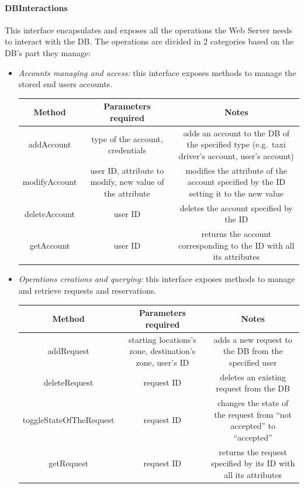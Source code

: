 \documentclass{article}
\begin{document}
\paragraph{DBInteractions}
This interface encapsulates and exposes all the operations the Web Server needs to interact with the DB\@. The operations are divided in 2 categories based on the DB's part they manage:
\begin{itemize}	
	\item \textit{Accounts managing and access:} this interface exposes methods to manage the stored end users accounts.	
	
		\begin{tabular}{*{3}{c}}
			\toprule
			Method & Parameters required & Notes \\
			\midrule
			addAccount & type of the account, credentials & adds an account to the DB of the specified type (e.g.\ taxi driver's account, user's account) \\
			modifyAccount & user ID, attribute to modify, new value of the attribute & modifies the attribute of the account specified by the ID setting it to the new value\\ 
			deleteAccount & user ID & deletes the account specified by the ID \\
			getAccount & user ID & returns the account corresponding to the ID with all its attributes \\
			\bottomrule
		\end{tabular}	
	\item \textit{Operations creations and querying:} this interface exposes methods to manage and retrieve requests and reservations.	
		\begin{tabular}{*{3}{c}}
			\toprule
			Method & Parameters required & Notes \\
			\midrule
			addRequest & starting locations's zone, destination's zone, user's ID & adds a new request to the DB from the specified user\\ %
			deleteRequest & request ID & deletes an existing request from the DB\\ 
			toggleStateOfTheRequest & request ID & changes the state of the request from ``not accepted'' to ``accepted''\\
			getRequest & request ID & returns the request specified by its ID with all its attributes \\

\end{tabular}
\end{itemize}
\end{document}
